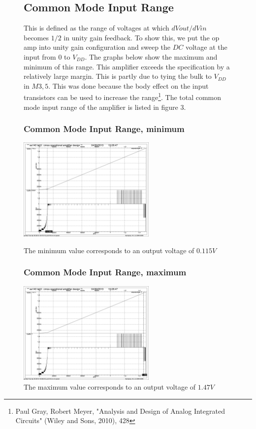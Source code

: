 \documentclass[]{article}
\begin{document}
		\begin{figure}
			\subsection{Common Mode Input Range}
			This is defined as the range of voltages at which $dVout/dVin$ becomes $1/2$ in unity gain feedback. To show this, we put the op amp into unity gain configuration and sweep the $DC$ voltage at the input from 0 to $V_{DD}$. The graphs below show the maximum and minimum of this range. This amplifier exceeds the specification by a relatively large margin. This is partly due to tying the bulk to $V_{DD}$ in $M3,5$. This was done because the body effect on the input transistors can be used to increase the range\footnote{\tiny Paul Gray, Robert Meyer, "Analysis and Design of Analog Integrated Circuits" (Wiley and Sons, 2010), 428}. The total common mode input range of the amplifier is listed in figure 3.
				\subsubsection{Common Mode Input Range, minimum}
				\includegraphics[width=0.6\textwidth]{common_mode_input_range_1.pdf}
				\caption{The minimum value corresponds to an output voltage of $0.115V$}
				\subsubsection{Common Mode Input Range, maximum}
				\includegraphics[width=0.6\textwidth]{common_mode_input_range_2.pdf}
				\caption{The maximum value corresponds to an output voltage of $1.47V$}

		\end{figure}
		
\end{document}
